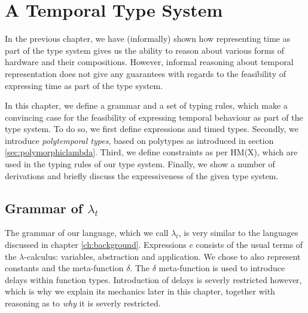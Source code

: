 
\chapter{A Temporal Type System} \label{ch:typesystem}
In the previous chapter, we have (informally) shown how representing time as part of the type system gives us the ability to reason about various forms of hardware and their compositions.
However, informal reasoning about temporal representation does not give any guarantees with regards to the feasibility of expressing time as part of the type system.

In this chapter, we define a grammar and a set of typing rules, which make a convincing case for the feasibility of expressing temporal behaviour as part of the type system.
To do so, we first define expressions and timed types.
Secondly, we introduce \textit{polytemporal types}, based on polytypes as introduced in section \ref{sec:polymorphiclambda}.
Third, we define constraints as per HM(X)\cite{odersky1999type}, which are used in the typing rules of our type system.
Finally, we show a number of derivations and briefly discuss the expressiveness of the given type system. 

\section{Grammar of $\lambda_t$}
The grammar of our language, which we call $\lambda_t$, is very similar to the languages discussed in chapter \ref{ch:background}.
Expressions $e$ consists of the usual terms of the $\lambda$-calculus: variables, abstraction and application.
We chose to also represent constants and the meta-function $\delta$.
The $\delta$ meta-function is used to introduce delays within function types.
Introduction of delays is severly restricted however, which is why we explain its mechanics later in this chapter, together with reasoning as to \textit{why} it is severly restricted.
 

